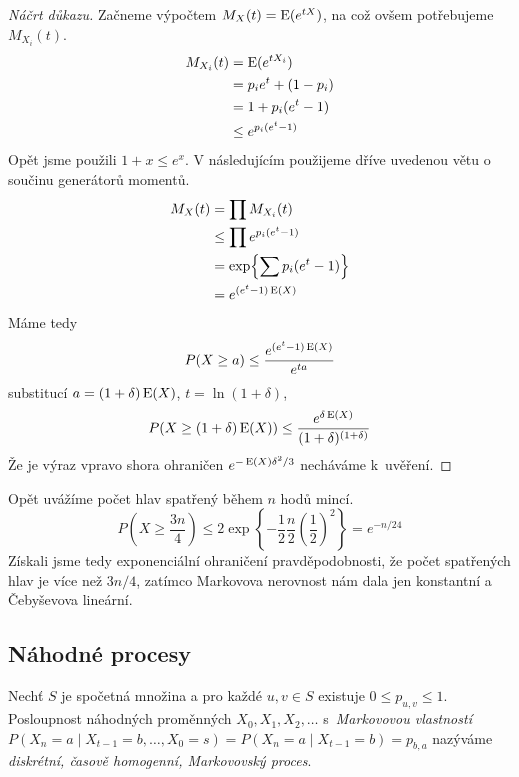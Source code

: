{\begin{proof}[Náčrt důkazu]

Začneme výpočtem $M_X(t) = \operatorname{E}(e^{tX})$, na což
ovšem potřebujeme $M_{X_i}(t)$.
\begin{align*}
    M_{X_i}(t) &= \operatorname{E}(e^{t X_i}) \\
    &= p_i e^t + (1 - p_i) \\
    &= 1 + p_i (e^t - 1) \\
    &\leq e^{p_i(e^t - 1)}
\end{align*}
Opět jsme použili $1 + x \leq e^x$. V následujícím použijeme dříve
uvedenou větu o součinu generátorů momentů.
\begin{align*}
    M_X(t) &= \prod M_{X_i}(t) \\
    &\leq \prod e^{p_i(e^t - 1)} \\
    &= \exp{\sum p_i(e^t - 1)} \\
    &= e^{(e^t-1)\operatorname{E}(X)}
\end{align*}
Máme tedy
\[
    P(X \geq a) \leq \frac{e^{(e^t-1)\operatorname{E}(X)}}{e^{ta}}
\]
substitucí $a = (1+\delta)\operatorname{E}(X)$, $t = \ln(1 + \delta)$,
\[
    P(X \geq (1 + \delta) \operatorname{E}(X)) \leq
    \frac{e^{\delta \operatorname{E}(X)}}{(1+\delta)^{(1+\delta)}}
\]
Že je výraz vpravo shora ohraničen $e^{- \operatorname{E}(X) \delta^2 / 3}$
necháváme k~uvěření.
\end{proof}

\begin{example}
    Opět uvážíme počet hlav spatřený během $n$ hodů mincí.
    \[
        P\left(X \geq \frac{3n}{4}\right)
        \leq 2 \exp \left\{ - \frac{1}{2} \frac{n}{2} \left(\frac{1}{2}\right)^2 \right\}
        = e^{-n/24}
    \]
    Získali jsme tedy exponenciální ohraničení pravděpodobnosti, že
    počet spatřených hlav je více než $3n/4$, zatímco Markovova
    nerovnost nám dala jen konstantní a Čebyševova lineární.
\end{example}

\subsection{Náhodné procesy}

\begin{definition}
    Nechť $S$ je spočetná množina a pro každé $u,v \in S$
    existuje $0 \leq p_{u,v} \leq 1$.
    Posloupnost náhodných proměnných $X_0, X_1, X_2, \ldots$
    s~{\em Markovovou vlastností}
    $P(X_n = a \mid X_{t-1} = b, \ldots, X_{0} = s)
    = P(X_n = a \mid X_{t-1} = b)
    = p_{b,a}$
    nazýváme {\em diskrétní, časově homogenní, Markovovský proces}.
\end{definition}

}
